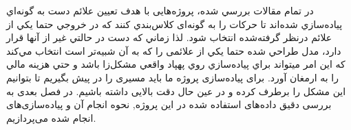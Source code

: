 در تمام مقالات بررسي شده، پروژه‌هایی با هدف تعیین علائم دست به گونه‌اي پياده‌سازي شده‌اند تا حركات را به گونه‌ای كلاس‌بندي كنند كه در خروجي حتما يكي از علائم درنظر گرفته‌شده انتخاب شود. لذا زماني كه دست در حالتي غير از آنها قرار دارد، مدل طراحي شده 
حتما يكي از علائمی را كه به آن شبيه‌تر است انتخاب مي‌كند كه اين امر ميتواند براي پياده‌سازي روي پهپاد واقعي مشكل‌زا باشد و حتي هزينه مالي را به ارمغان آورد. برای پیاده‌سازی پروژه ما باید مسیری را در پیش بگیریم تا بتوانیم این مشکل را برطرف کرده و در عین حال دقت بالایی داشته باشیم.
در فصل بعدی به بررسی دقیق داده‌های استفاده شده در این پروژه‌‌‌, نحوه انجام آن و پیاده‌سازی‌های انجام شده می‌پردازیم.
